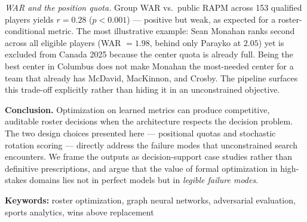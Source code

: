 \documentclass[11pt,letterpaper]{article}
\begin{document}
\vspace{0.5em}
\textit{WAR and the position quota.}
Group WAR vs.\ public RAPM across 153 qualified players yields
$r=0.28$ ($p<0.001$) — positive but weak, as expected for a
roster-conditional metric. The most illustrative example: Sean
Monahan ranks second across all eligible players (WAR $= 1.98$,
behind only Parayko at $2.05$) yet is excluded from Canada 2025
because the center quota is already full. Being the best center in
Columbus does not make Monahan the most-needed center for a team
that already has McDavid, MacKinnon, and Crosby. The pipeline
surfaces this trade-off explicitly rather than hiding it in an
unconstrained objective.

\vspace{0.4em}
\textbf{Conclusion.}
Optimization on learned metrics can produce competitive,
auditable roster decisions when the architecture respects the
decision problem. The two design choices presented here —
positional quotas and stochastic rotation scoring — directly address
the failure modes that unconstrained search encounters. We frame the
outputs as decision-support case studies rather than definitive
prescriptions, and argue that the value of formal optimization in
high-stakes domains lies not in perfect models but in
\emph{legible failure modes}.

\vspace{0.4em}
{\small\color{gray}
\textbf{Keywords:} roster optimization, graph neural networks,
adversarial evaluation, sports analytics, wins above replacement
}
\end{document}
